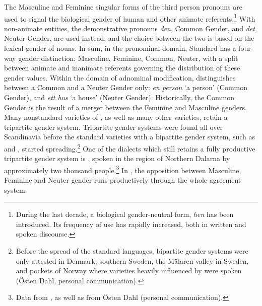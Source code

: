 \documentclass[output=collectionpaper]{langsci/langscibook}
\begin{document}
\largerpage[1.5]
 The Masculine and Feminine singular forms of the third person pronouns are used to signal the biological gender of human and other animate referents.\footnote{During the last decade, a biological gender-neutral form, \textit{hen} has been introduced. Its frequency of use has rapidly increased, both in written and spoken  discourse.}
With non-animate entities, the demonstrative pronouns \textit{den}, Common Gender, and \textit{det}, Neuter Gender, are used instead, and the choice between the two is based on the lexical gender of nouns. In sum, in the pronominal domain, Standard  has a four-way gender distinction: Masculine, Feminine, Common, Neuter, with a split between animate and inanimate referents governing the distribution of these gender values.  Within the domain of adnominal modification,  distinguishes between a Common and a Neuter Gender only: \textit{en person} `a person' (Common Gender), and \textit{ett hus} `a house' (Neuter Gender). Historically, the Common Gender is the result of a merger between the Feminine and Masculine genders. Many nonstandard varieties of , as well as many other  varieties, retain a tripartite gender system. Tripartite gender systems were found all over Scandinavia before the standard varieties with a bipartite gender system, such as  and , started spreading.\footnote{Before the spread of the standard languages, bipartite gender systems were only attested in Denmark, southern Sweden, the M\"alaren valley in Sweden, and pockets of Norway where varieties heavily influenced by  were spoken (\"Osten Dahl, personal communication).} One of the  dialects which still retains a fully productive tripartite gender system is , spoken in the  region of Northern Dalarna by approximately two thousand people.\footnote{Data from \citet{AAkerberg2012}, as well as from Östen Dahl (personal communication).} In , the opposition between Masculine, Feminine and Neuter gender runs productively through the whole agreement system.
\end{document}
